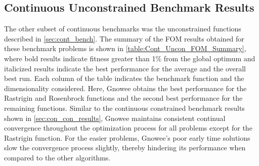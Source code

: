 \documentclass{article}                                                                           %
\begin{document}
\subsection{Continuous Unconstrained Benchmark Results} \label{con_uncon_results} 
The other subset of continuous benchmarks was the unconstrained functions described in \autoref{sec:cont_bench}.
The summary of the FOM results obtained for these benchmark problems is shown in \autoref{table:Cont_Uncon_FOM_Summary}, where bold results indicate fitness greater than 1\% from the global optimum and italicized results indicate the best performance for the average and the overall best run.
Each column of the table indicates the benchmark function and the dimensionality considered.  
Here, Gnowee obtains the best performance for the Rastrigin and Rosenbrock functions and the second best performance for the remaining functions.
Similar to the continuous constrained benchmark results shown in \autoref{sec:con_con_results}, Gnowee maintains consistent continual convergence throughout the optimization process for all problems except for the Rastrigin function.
For the easier problems, Gnowee's poor early time solutions slow the convergence process slightly, thereby hindering its performance when compared to the other algorithms. 

\pagestyle{empty}
\begin{landscape}
\begin{table}[!t]
\centering
\caption{Summary of FOM results for continuous unconstrained optimization benchmarks.}
  	\renewcommand\arraystretch{1.5} %
\label{table:Cont_Uncon_FOM_Summary}
\end{table}
\end{landscape}
\pagestyle{plain}
\end{document}
